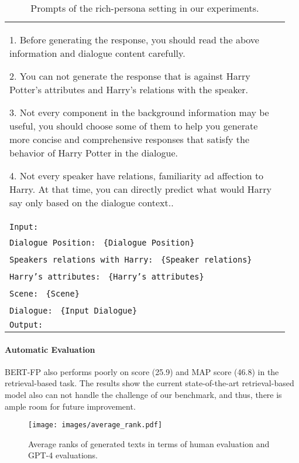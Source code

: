 \documentclass[11pt]{article}
\begin{document}
\begin{table*}[!t]
\begin{tabular}{p{0.95\linewidth}}
1. Before generating the response, you should read the above information and dialogue content carefully.

2. You can not generate the response that is against Harry Potter's attributes and Harry’s relations with the speaker.

3. Not every component in the background information may  be useful, you should choose some of them to help you generate more concise and comprehensive responses that satisfy the behavior of Harry Potter in the dialogue.

4. Not every speaker have relations, familiarity ad affection to Harry. At that time, you can directly predict what would Harry say only based on the dialogue context..\\
\texttt{Input:} \\
 \texttt{Dialogue Position:} \texttt{ \{Dialogue Position\}} \\
  \texttt{Speakers relations with Harry:} \texttt{ \{Speaker relations\}} \\
\texttt{Harry's attributes:} \texttt{ \{Harry's attributes\}} \\
\texttt{Scene:} \texttt{ \{Scene\}} \\
\texttt{Dialogue:} \texttt{ \{Input Dialogue\}} \\
\texttt{Output:} \\
\bottomrule
\end{tabular}
\caption{Prompts of the rich-persona setting in our experiments. } \label{table:persona}
\vspace{-5mm}
\end{table*} 
\paragraph{Automatic Evaluation}


BERT-FP also performs poorly on  score (25.9) and MAP score (46.8)  in the retrieval-based task. The results show the current state-of-the-art retrieval-based model also can not handle the challenge of our benchmark, and thus, there is ample room for future improvement.


\begin{figure*}
    \centering
    \texttt{[image: images/average\_rank.pdf]}
       \caption{Average ranks of generated texts in terms of human evaluation and GPT-4 evaluations.}
       \vspace{-15pt}
    \label{fig:average_rank}
\end{figure*}
\end{document}
